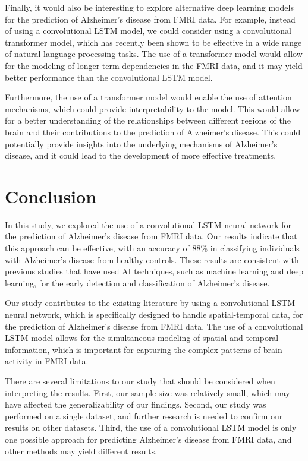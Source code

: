 \documentclass[10pt]{article}
\begin{document}
	Finally, it would also be interesting to explore alternative deep learning models for the prediction of Alzheimer's disease from FMRI data. For example, instead of using a convolutional LSTM model, we could consider using a convolutional transformer model, which has recently been shown to be effective in a wide range of natural language processing tasks. The use of a transformer model would allow for the modeling of longer-term dependencies in the FMRI data, and it may yield better performance than the convolutional LSTM model.

	Furthermore, the use of a transformer model would enable the use of attention mechanisms, which could provide interpretability to the model. This would allow for a better understanding of the relationships between different regions of the brain and their contributions to the prediction of Alzheimer's disease. This could potentially provide insights into the underlying mechanisms of Alzheimer's disease, and it could lead to the development of more effective treatments.

	\section{Conclusion}

	In this study, we explored the use of a convolutional LSTM neural network for the prediction of Alzheimer's disease from FMRI data. Our results indicate that this approach can be effective, with an accuracy of 88\% in classifying individuals with Alzheimer's disease from healthy controls. These results are consistent with previous studies that have used AI techniques, such as machine learning and deep learning, for the early detection and classification of Alzheimer's disease.

	Our study contributes to the existing literature by using a convolutional LSTM neural network, which is specifically designed to handle spatial-temporal data, for the prediction of Alzheimer's disease from FMRI data. The use of a convolutional LSTM model allows for the simultaneous modeling of spatial and temporal information, which is important for capturing the complex patterns of brain activity in FMRI data.

	There are several limitations to our study that should be considered when interpreting the results. First, our sample size was relatively small, which may have affected the generalizability of our findings. Second, our study was performed on a single dataset, and further research is needed to confirm our results on other datasets. Third, the use of a convolutional LSTM model is only one possible approach for predicting Alzheimer's disease from FMRI data, and other methods may yield different results.
\end{document}
